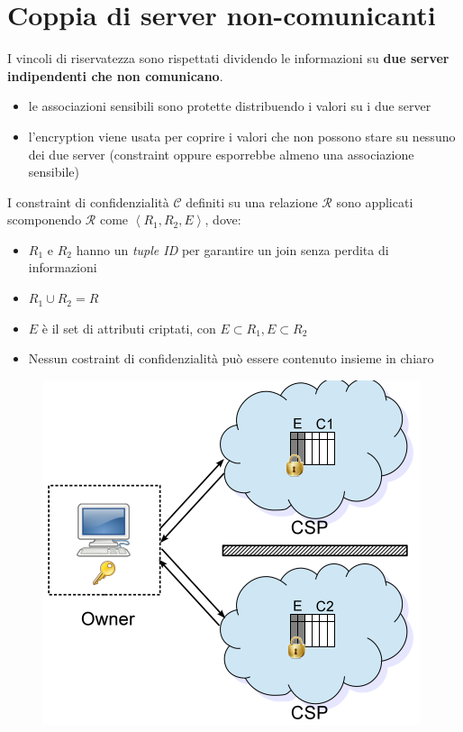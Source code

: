\documentclass{report}
\begin{document}
\section{Coppia di server non-comunicanti}
I vincoli di riservatezza sono rispettati dividendo le informazioni
su \textbf{due server indipendenti che non comunicano}.
\begin{itemize}
    \item le associazioni sensibili sono protette distribuendo i valori su 
    i due server 
    \item l'encryption viene usata per coprire i valori che non possono stare su nessuno dei due server (constraint oppure 
    esporrebbe almeno una associazione sensibile)
\end{itemize}

I constraint di confidenzialità $\mathcal{C}$ definiti su una relazione 
$\mathcal{R}$ sono applicati scomponendo $\mathcal{R}$ come $\left\langle R_1, R_2, E \right\rangle$, dove:
\begin{itemize}
    \item $R_1$ e $R_2$ hanno un \textit{tuple ID} per garantire un join senza perdita di informazioni
    \item $R_1 \cup R_2 = R $
    \item $E$ è il set di attributi criptati, con $E \subset R_1, E \subset R_2$
    \item Nessun costraint di confidenzialità può essere contenuto insieme in chiaro  
\end{itemize}

\begin{figure}[ht]
    \centering
    \includegraphics[width=0.5\linewidth]{images/encryption-fragmentation/couple-frag.png}
\end{figure}
\end{document}
